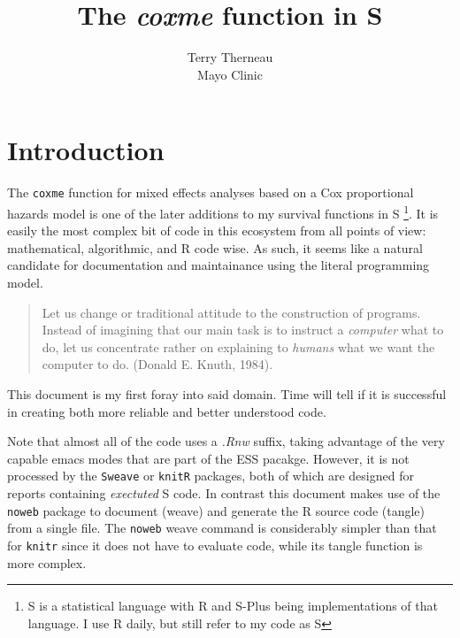 \documentclass{article}
\title{The \emph{coxme} function in S}
\author{Terry Therneau \\ Mayo Clinic}
\begin{document}
\maketitle
\tableofcontents
\section{Introduction}
 The \Verb!coxme! function for mixed effects analyses based on a Cox
proportional hazards model is one of the later additions to my 
survival functions in S
\footnote{S is a statistical language with R and S-Plus being implementations
 of that language.  I use R daily, but still refer to my code as S}.
It is easily the most complex bit of code in this ecosystem from all points
of view: mathematical, algorithmic, and R code wise.
As such, it seems like a natural candidate for documentation and 
maintainance using the literal programming model.  
\begin{quotation}
Let us change or traditional attitude to the construction of programs.
Instead of imagining that our main task is to instruct a \emph{computer}
what to do, let us concentrate rather on explaining to \emph{humans}
what we want the computer to do.  (Donald E. Knuth, 1984).
\end{quotation}

This document is my first foray into said domain.  
Time will tell if it is successful in creating both more reliable and
better understood code.

Note that almost all of the code uses a \emph{.Rnw} suffix, taking
advantage of the very capable emacs modes that are part of the ESS pacakge.
However, it is not processed by the \Verb!Sweave! or \Verb?knitR?
packages, both of which are designed for reports containing 
\emph{exectuted} S code.   
In contrast this document makes use of the \Verb!noweb! package to document (weave)
and generate the R source code (tangle) from a single file.
The \Verb!noweb! weave command is considerably simpler than that for \Verb?knitr?
since it does not have to evaluate code, while its tangle function is
more complex.
\end{document}
